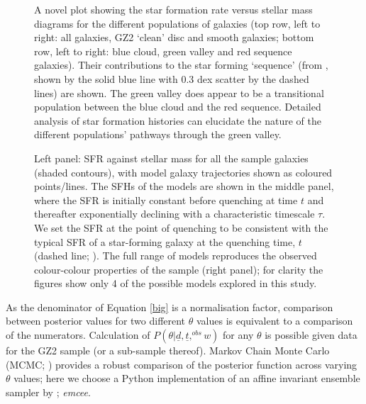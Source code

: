 \documentclass{mn2e}
\begin{document}
\begin{figure}
\caption{A novel plot showing the star formation rate versus stellar mass diagrams for the different populations of galaxies  (top row, left to right: all galaxies, GZ2 `clean' disc and smooth galaxies; bottom row, left to right: blue cloud, green valley and red sequence galaxies). Their contributions to the star forming `sequence' (from \citet{Peng}, shown by the solid blue line with 0.3 dex scatter by the dashed lines) are shown. The green valley does appear to be a transitional population between the blue cloud and the red sequence. Detailed analysis of star formation histories can elucidate the nature of the different populations' pathways through the green valley.}
\label{sfr_mass_sub}
\end{figure}

\begin{figure}
\caption{Left panel: SFR against stellar mass for all the sample galaxies (shaded contours), with model galaxy trajectories shown as coloured points/lines. The SFHs of the models are shown in the middle panel, where the SFR is initially constant before quenching at time $t$ and thereafter exponentially declining with a characteristic timescale $\tau$. We set the SFR at the point of quenching to be consistent with the typical SFR of a star-forming galaxy at the quenching time, $t$ (dashed line; \citealt{Peng}). The full range of models reproduces the observed colour-colour properties of the sample (right panel); for clarity the figures show only 4 of the possible models explored in this study.}
\label{sfr_mass_col}
\end{figure}


As the denominator of Equation \ref{big} is a normalisation factor, comparison between posterior values for two different  $\theta$ values is equivalent to a comparison of the numerators. Calculation of $P(\theta|\underline{d}, \underline{t},^{obs} w)$  for any $\theta$ is possible given data for the GZ2 sample (or a sub-sample thereof). Markov Chain Monte Carlo (MCMC; \citealt{MacKay, Dan, GW10}) provides a robust comparison of the posterior function across varying $\theta$ values; here we choose a Python implementation of an affine invariant ensemble sampler by \cite{Dan}; \emph{emcee}.
\end{document}
